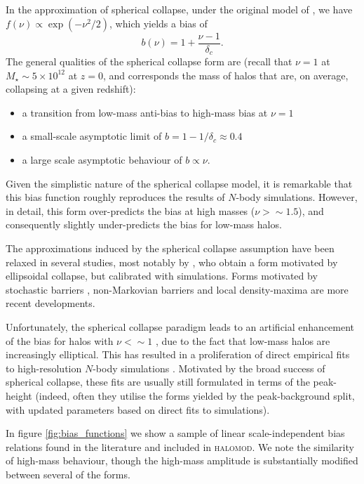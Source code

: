 \documentclass[5p,aas_macros]{elsarticle}
\newcommand{\halomod}{\textsc{halomod}}
\begin{document}
In the approximation of spherical collapse, under the original model of \citep{Press1974}, we have $f(\nu) \propto \exp(-\nu^2/2)$, which yields a bias of  \citep{Cole1989,Mo1996}
\begin{equation}
    b(\nu) = 1+ \frac{\nu -1}{\delta_c}.
\end{equation}
The general qualities of the spherical collapse form are (recall that $\nu = 1$ at $M_\star \sim 5\times10^{12}$ at $z=0$, and corresponds the mass of halos that are, on average, collapsing at a given redshift): 
\begin{itemize}
    \item  a transition from low-mass anti-bias to high-mass bias at $\nu = 1$
    \item a small-scale asymptotic limit of $b = 1 - 1/\delta_c \approx 0.4$
    \item a large scale asymptotic behaviour of $b \propto \nu$. 
\end{itemize}

Given the simplistic nature of the spherical collapse model, it is remarkable that this bias function roughly reproduces the results of $N$-body simulations. However, in detail, this form over-predicts the bias at high masses ($\nu >\sim1.5$), and consequently slightly under-predicts the bias for low-mass halos. 

The approximations induced by the spherical collapse assumption have been relaxed in several studies, most notably by \citet{Sheth2001}, who obtain a form motivated by ellipsoidal collapse, but calibrated with simulations. Forms motivated by stochastic barriers \citep{Corasaniti2011}, non-Markovian barriers \citep{Ma2011} and local density-maxima \citep{Paranjape2013a} are more recent developments.

Unfortunately, the spherical collapse paradigm leads to an artificial enhancement of the bias for halos with $\nu < \sim 1$ \citep{Manera2010,Tinker2010}, due to the fact that low-mass halos are increasingly elliptical. This has resulted in a proliferation of direct empirical fits to high-resolution $N$-body simulations \citep{Jing1998,Jing1999,Seljak2004,Tinker2005,Mandelbaum2005,Pillepich2010}.
Motivated by the broad success of spherical collapse, these fits are usually \citep[but see][]{Jing1998,Seljak2004} still formulated in terms of the peak-height (indeed, often they utilise the forms yielded by the peak-background split, with updated parameters based on direct fits to simulations).

In figure \ref{fig:bias_functions} we show a sample of linear scale-independent bias relations found in the literature and included in \halomod. We note the similarity of high-mass behaviour, though the high-mass amplitude is substantially modified between several of the forms. 
\end{document}
